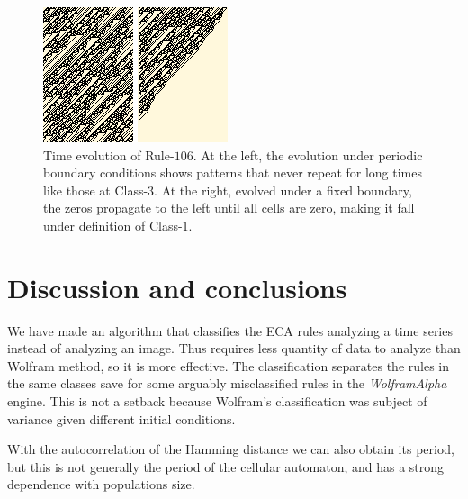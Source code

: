 \begin{figure}
    \centering
    \includegraphics[width=\linewidth]{Images/P4/106.png}
    \caption{Time evolution of Rule-$106$. At the left, the evolution under periodic boundary conditions shows patterns that never repeat for long times like those at Class-$3$. At the right, evolved under a fixed boundary, the zeros propagate to the left until all cells are zero, making it fall under definition of Class-$1$.}
    \label{fig:Rule106}
\end{figure}



\section{Discussion and conclusions}

We have made an algorithm that classifies the ECA rules analyzing a time series instead of analyzing an image. Thus requires less quantity of data to analyze than Wolfram method, so it is more effective. The classification separates the rules in the same classes save for some arguably misclassified rules in the \textit{WolframAlpha} engine. This is not a setback  because Wolfram's classification was subject of variance given different initial conditions.

With the autocorrelation of the Hamming distance we can also obtain its period, but this is not generally the period of the cellular automaton, and has a strong dependence with populations size.


